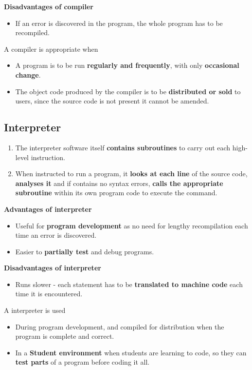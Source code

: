 \textbf{Disadvantages of compiler}
\begin{itemize}
    \item If an error is discovered in the program, the whole program has to be recompiled.
\end{itemize}

A compiler is appropriate when
\begin{itemize}
    \item A program is to be run \textbf{regularly and frequently}, with only \textbf{occasional change}.
    \item The object code produced by the compiler is to be \textbf{distributed or sold} to users, since the source code is not present it cannot be amended.
\end{itemize}

\subsection*{Interpreter}

\begin{enumerate}
    \item The interpreter software itself \textbf{contains subroutines} to carry out each high-level instruction.
    \item When instructed to run a program, it \textbf{looks at each line} of the source code, \textbf{analyses it} and if contains no syntax errors, \textbf{calls the appropriate subroutine} within its own program code to execute the command.
\end{enumerate}

\textbf{Advantages of interpreter}
\begin{itemize}
    \item Useful for \textbf{program development} as no need for lengthy recompilation each time an error is discovered.
    \item Easier to \textbf{partially test} and debug programs.
\end{itemize}

\textbf{Disadvantages of interpreter}
\begin{itemize}
    \item Runs slower - each statement has to be \textbf{translated to machine code} each time it is encountered.
\end{itemize}

A interpreter is used
\begin{itemize}
    \item During program development, and compiled for distribution when the program is complete and correct.
    \item In a \textbf{Student environment} when students are learning to code, so they can \textbf{test parts} of a program before coding it all.
\end{itemize}


